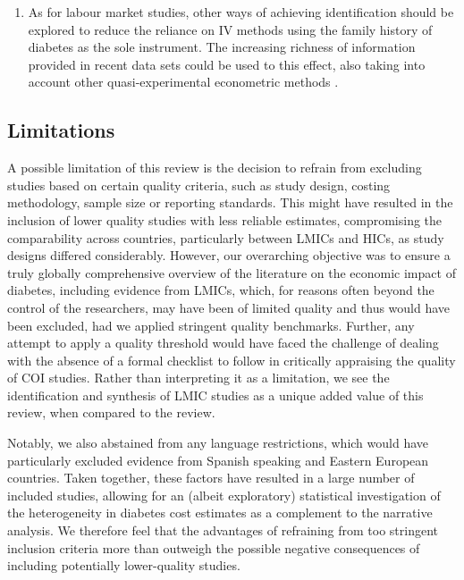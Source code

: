 \begin{enumerate}
\item	As for labour market studies, other ways of achieving identification should be explored to reduce the reliance on \ac{IV} methods using the family history of diabetes as the sole instrument. The increasing richness of information provided in recent data sets could be used to this effect, also taking into account other quasi-experimental econometric methods \parencite{Craig2012}.
\end{enumerate}

\subsection{Limitations}
A possible limitation of this review is the decision to refrain from excluding studies based on certain quality criteria, such as study design, costing methodology, sample size or reporting standards. This might have resulted in the inclusion of lower quality studies with less reliable estimates, compromising the comparability across countries, particularly between \acp{LMIC} and \acp{HIC}, as study designs differed considerably. However, our overarching objective was to ensure a truly globally comprehensive overview of the literature on the economic impact of diabetes, including evidence from \acp{LMIC}, which, for reasons often beyond the control of the researchers, may have been of limited quality and thus would have been excluded, had we applied stringent quality benchmarks. Further, any attempt to apply a quality threshold would have faced the challenge of dealing with the absence of a formal checklist to follow in critically appraising the quality of \ac{COI} studies. Rather than interpreting it as a limitation, we see the identification and synthesis of \ac{LMIC} studies as a unique added value of this review, when compared to the \textcite{Ettaro2004} review. 

Notably, we also abstained from any language restrictions, which would have particularly excluded evidence from Spanish speaking and Eastern European countries. Taken together, these factors have resulted in a large number of included studies, allowing for an (albeit exploratory) statistical investigation of the heterogeneity in diabetes cost estimates as a complement to the narrative analysis. We therefore feel that the advantages of refraining from too stringent inclusion criteria more than outweigh the possible negative consequences of including potentially lower-quality studies.

